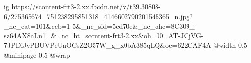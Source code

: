  
 
 
 
 

\ifcmt
  ig https://scontent-frt3-2.xx.fbcdn.net/v/t39.30808-6/275365674_751238295851318_4146602790201545365_n.jpg?_nc_cat=101&ccb=1-5&_nc_sid=5cd70e&_nc_ohc=8C309_-sz64AX8nLn1_&_nc_ht=scontent-frt3-2.xx&oh=00_AT-JCjVG-7JPDiJvPBUVPeUnOCsZ2O57W_g_x0bA385qLQ&oe=622CAF4A
  @width 0.5
  @minipage 0.5
  @wrap \parpic[r]
\fi
